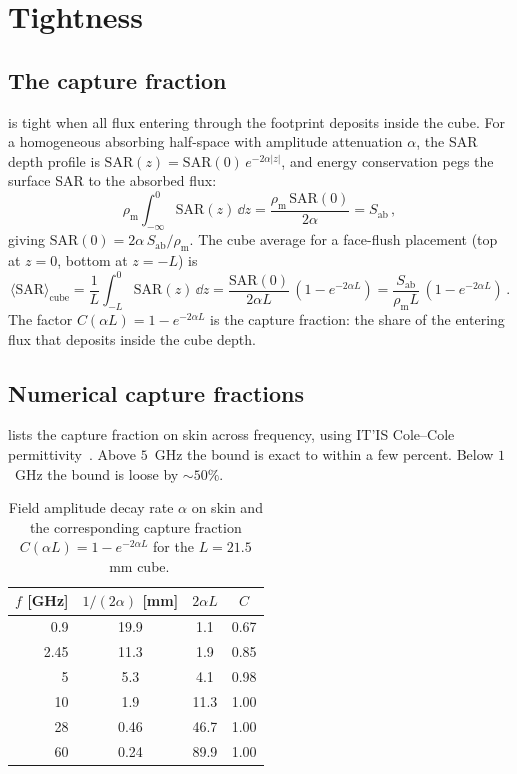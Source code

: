 \documentclass[11pt,a4paper]{article}
\theoremstyle{definition}
\theoremstyle{remark}
\newcommand{\APD}{S_{\mathrm{ab}}}
\newcommand{\SAR}{\ensuremath{\mathrm{SAR}}}
\newcommand{\rhom}{\rho_{\mathrm{m}}}
\begin{document}
\section{Tightness}\label{sec:tightness}

\subsection{The capture fraction}

 is tight when all flux entering through the footprint
deposits inside the cube. For a homogeneous absorbing half-space with
amplitude attenuation $\alpha$, the SAR depth profile is
$\SAR(z) = \SAR(0)\,e^{-2\alpha|z|}$, and energy conservation pegs the
surface SAR to the absorbed flux:
\begin{equation}\label{eq:SAR0}
  \rhom \int_{-\infty}^{0} \SAR(z)\,\dd z
  = \frac{\rhom\,\SAR(0)}{2\alpha}
  = \APD\, ,
\end{equation}
giving $\SAR(0) = 2\alpha\,\APD/\rhom$. The cube average for a face-flush
placement (top at $z = 0$, bottom at $z = -L$) is
\begin{equation}\label{eq:cube-avg}
  \langle\SAR\rangle_{\mathrm{cube}}
  = \frac{1}{L}\int_{-L}^{0} \SAR(z)\,\dd z
  = \frac{\SAR(0)}{2\alpha L}\,(1 - e^{-2\alpha L})
  = \frac{\APD}{\rhom L}\,(1 - e^{-2\alpha L})\, .
\end{equation}
The factor $C(\alpha L) = 1 - e^{-2\alpha L}$ is the capture fraction:
the share of the entering flux that deposits inside the cube depth.

\subsection{Numerical capture fractions}

 lists the capture fraction on skin across frequency,
using IT'IS Cole--Cole permittivity~\cite{ITIS}. Above $5$~GHz the
bound is exact to within a few percent. Below $1$~GHz the bound is
loose by $\sim 50\%$.

\begin{table}[h]
\centering
\caption{Field amplitude decay rate $\alpha$ on skin and the
corresponding capture fraction $C(\alpha L) = 1 - e^{-2\alpha L}$ for
the $L = 21.5$~mm cube.}\label{tab:capture}
\begin{tabular}{rccc}
\toprule
$f$ [GHz] & $1/(2\alpha)$ [mm] & $2\alpha L$ & $C$ \\
\midrule
0.9  & 19.9 & 1.1  & 0.67 \\
2.45 & 11.3 & 1.9  & 0.85 \\
5    &  5.3 & 4.1  & 0.98 \\
10   &  1.9 & 11.3 & 1.00 \\
28   & 0.46 & 46.7 & 1.00 \\
60   & 0.24 & 89.9 & 1.00 \\
\bottomrule
\end{tabular}
\end{table}
\end{document}
